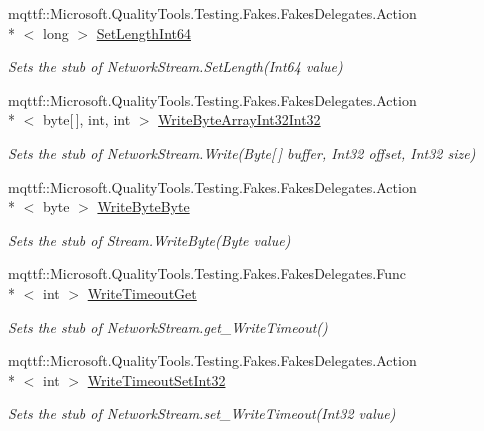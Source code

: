 \begin{DoxyCompactItemize}
mqttf\-::\-Microsoft.\-Quality\-Tools.\-Testing.\-Fakes.\-Fakes\-Delegates.\-Action\\*
$<$ long $>$ \hyperlink{class_system_1_1_net_1_1_sockets_1_1_fakes_1_1_stub_network_stream_aefd653f11370ff514e56c7f62d69d464}{Set\-Length\-Int64}
\begin{DoxyCompactList}\small\item\em Sets the stub of Network\-Stream.\-Set\-Length(\-Int64 value)\end{DoxyCompactList}\item 
mqttf\-::\-Microsoft.\-Quality\-Tools.\-Testing.\-Fakes.\-Fakes\-Delegates.\-Action\\*
$<$ byte\mbox{[}$\,$\mbox{]}, int, int $>$ \hyperlink{class_system_1_1_net_1_1_sockets_1_1_fakes_1_1_stub_network_stream_a1ad27ca1c420858a388d21fbdc87240b}{Write\-Byte\-Array\-Int32\-Int32}
\begin{DoxyCompactList}\small\item\em Sets the stub of Network\-Stream.\-Write(\-Byte\mbox{[}$\,$\mbox{]} buffer, Int32 offset, Int32 size)\end{DoxyCompactList}\item 
mqttf\-::\-Microsoft.\-Quality\-Tools.\-Testing.\-Fakes.\-Fakes\-Delegates.\-Action\\*
$<$ byte $>$ \hyperlink{class_system_1_1_net_1_1_sockets_1_1_fakes_1_1_stub_network_stream_ab37905d132639f69fd402439ec17b43f}{Write\-Byte\-Byte}
\begin{DoxyCompactList}\small\item\em Sets the stub of Stream.\-Write\-Byte(\-Byte value)\end{DoxyCompactList}\item 
mqttf\-::\-Microsoft.\-Quality\-Tools.\-Testing.\-Fakes.\-Fakes\-Delegates.\-Func\\*
$<$ int $>$ \hyperlink{class_system_1_1_net_1_1_sockets_1_1_fakes_1_1_stub_network_stream_abf2f65229a61e30f655906fea2446e40}{Write\-Timeout\-Get}
\begin{DoxyCompactList}\small\item\em Sets the stub of Network\-Stream.\-get\-\_\-\-Write\-Timeout()\end{DoxyCompactList}\item 
mqttf\-::\-Microsoft.\-Quality\-Tools.\-Testing.\-Fakes.\-Fakes\-Delegates.\-Action\\*
$<$ int $>$ \hyperlink{class_system_1_1_net_1_1_sockets_1_1_fakes_1_1_stub_network_stream_ac7d52d17cbe535ef5d30dd0d94f32341}{Write\-Timeout\-Set\-Int32}
\begin{DoxyCompactList}\small\item\em Sets the stub of Network\-Stream.\-set\-\_\-\-Write\-Timeout(\-Int32 value)\end{DoxyCompactList}\end{DoxyCompactItemize}
